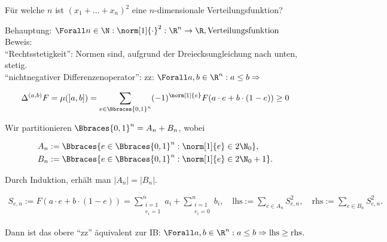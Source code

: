 
\begin{exercise}

Für welche $n$ ist $(x_1 + \ldots + x_n)^2$ eine $n$-dimensionale Verteilungsfunktion?

\end{exercise}


\begin{solution}

Behauptung: $\Forall n \in \N: \norm[1]{\cdot}^2: \R^n \to \R, \text{Verteilungsfunktion}$ \\

Beweis: \\

\enquote{Rechtsstetigkeit}: Normen sind, aufgrund der Dreiecksungleichung nach unten, stetig. \\

\enquote{nichtnegativer Differenzenoperator}: zz: $\Forall a, b \in \R^n: a \leq b \Rightarrow$

\begin{align*}
  \Delta^{(a, b)} F
  =
  \mu(]a, b])
  =
  \sum_{e \in \Bbraces{0, 1}^n}
  (-1)^{\norm[1]{e}}
  F(a \cdot e + b \cdot (1 - e)) \geq 0
\end{align*}

Wir partitionieren $\Bbraces{0, 1}^n = A_n + B_n$, wobei

\begin{align*}
  A_n & := \Bbraces{e \in \Bbraces{0, 1}^n: \norm[1]{e} \in 2 \N_0}, \\
  B_n & := \Bbraces{e \in \Bbraces{0, 1}^n: \norm[1]{e} \in 2 \N_0 + 1}.
\end{align*}

Durch Induktion, erhält man $|A_n| = |B_n|$.

\begin{align*}
  S_{e, n}
  :=
  F(a \cdot e + b \cdot (1 - e))
  =
  \sum_{\substack{i = 1 \\ e_i = 1}}^n a_i +
  \sum_{\substack{i = 1 \\ e_i = 0}}^n b_i,
  \quad
  \text{lhs} := \sum_{e \in A_n} S_{e, n}^2,
  \quad
  \text{rhs} := \sum_{e \in B_n} S_{e, n}^2.
\end{align*}

Dann ist das obere \enquote{zz} äquivalent zur IB: $\Forall a, b \in \R^n: a \leq b \Rightarrow \text{lhs} \geq \text{rhs}$. \\


\end{solution}
